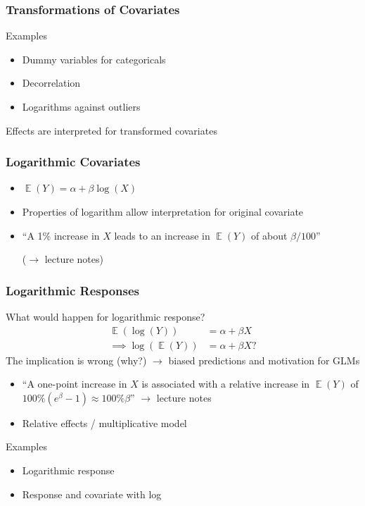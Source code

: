 \documentclass[
    utf8,
    aspectratio=169
]{beamer}  %
\DeclareMathOperator{\E}{\mathbb{E}}  %
\begin{document}
\begin{frame}
\frametitle{Transformations of Covariates}
\begin{block}{Examples}
	\begin{itemize}
		\item Dummy variables for categoricals
		\item Decorrelation
		\item Logarithms against outliers
	\end{itemize}
\end{block}

\vfill

Effects are interpreted for transformed covariates
\end{frame}

\begin{frame}
\frametitle{Logarithmic Covariates}
\begin{itemize}
	\item $\E(Y) = \alpha + \beta\log(X)$
	\item Properties of logarithm allow interpretation \alert{for original covariate}
	\item ``A 1\% increase in $X$ leads to an increase in $\E(Y)$ of about $\beta/100$''
	
	($\rightarrow$ lecture notes)
	
	\vfill
	
	\begin{example}
	\end{example}
\end{itemize}
\end{frame}

\begin{frame}
\frametitle{Logarithmic Responses}
What would happen for logarithmic response?
\begin{align*}
\E(\log(Y)) &= \alpha + \beta X \\
\implies \log(\E(Y)) &= \alpha + \beta X?
\end{align*}
The implication is wrong (why?) $\rightarrow$ biased predictions and motivation for GLMs

\begin{itemize}
	\item ``A one-point increase in $X$ is associated with a relative increase in $\E(Y)$ of $100\%(e^\beta - 1)\approx 100\% \beta$''
	$\rightarrow$ lecture notes
	\item Relative effects / multiplicative model
\end{itemize}

\begin{exampleblock}{Examples}
	\begin{itemize}
		\item Logarithmic response
		\item Response and covariate with log
	\end{itemize}
\end{exampleblock}
\end{frame}
\end{document}
